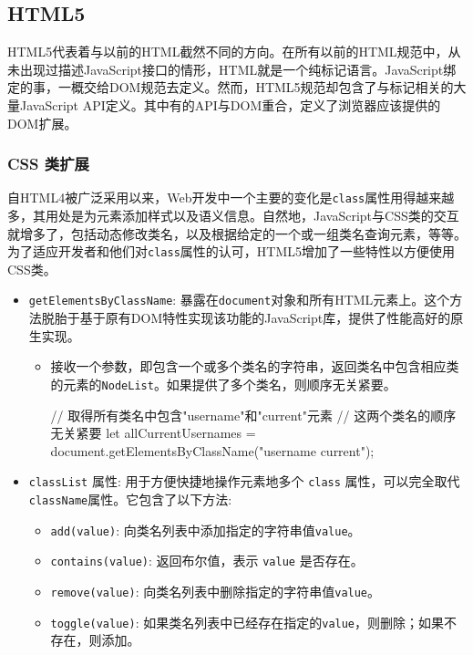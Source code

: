 \subsection{HTML5}

HTML5代表着与以前的HTML截然不同的方向。在所有以前的HTML规范中，从未出现过描述JavaScript接口的情形，HTML就是一个纯标记语言。JavaScript绑定的事，一概交给DOM规范去定义。然而，HTML5规范却包含了与标记相关的大量JavaScript API定义。其中有的API与DOM重合，定义了浏览器应该提供的DOM扩展。

\subsubsection*{CSS 类扩展}

自HTML4被广泛采用以来，Web开发中一个主要的变化是\texttt{class}属性用得越来越多，其用处是为元素添加样式以及语义信息。自然地，JavaScript与CSS类的交互就增多了，包括动态修改类名，以及根据给定的一个或一组类名查询元素，等等。为了适应开发者和他们对\texttt{class}属性的认可，HTML5增加了一些特性以方便使用CSS类。

\begin{itemize}
    \item \texttt{getElementsByClassName}: 暴露在\texttt{document}对象和所有HTML元素上。这个方法脱胎于基于原有DOM特性实现该功能的JavaScript库，提供了性能高好的原生实现。
    \begin{itemize}
        \item 接收一个参数，即包含一个或多个类名的字符串，返回类名中包含相应类的元素的\texttt{NodeList}。如果提供了多个类名，则顺序无关紧要。
\begin{JavaScript}
// 取得所有类名中包含"username"和"current"元素
// 这两个类名的顺序无关紧要
let allCurrentUsernames = document.getElementsByClassName("username current"); 
\end{JavaScript}
    \end{itemize}
    \item \texttt{classList} 属性: 用于方便快捷地操作元素地多个 \texttt{class} 属性，可以完全取代 \texttt{className}属性。它包含了以下方法:
    \begin{itemize}
        \item \texttt{add(value)}: 向类名列表中添加指定的字符串值\texttt{value}。
        \item \texttt{contains(value)}: 返回布尔值，表示 \texttt{value} 是否存在。
        \item \texttt{remove(value)}: 向类名列表中删除指定的字符串值\texttt{value}。
        \item \texttt{toggle(value)}: 如果类名列表中已经存在指定的\texttt{value}，则删除；如果不存在，则添加。
    \end{itemize}
\end{itemize}

